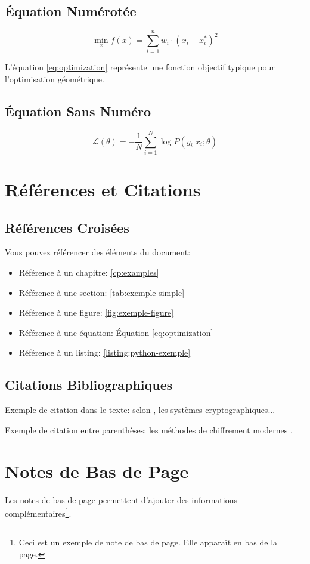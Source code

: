 \subsection{Équation Numérotée}
\begin{equation}
\label{eq:optimization}
\min_{x} f(x) = \sum_{i=1}^{n} w_i \cdot (x_i - x_i^*)^2
\end{equation}

L'équation \ref{eq:optimization} représente une fonction objectif typique pour l'optimisation géométrique.

\subsection{Équation Sans Numéro}
\[
\mathcal{L}(\theta) = -\frac{1}{N} \sum_{i=1}^{N} \log P(y_i | x_i; \theta)
\]

\section{Références et Citations}

\subsection{Références Croisées}
Vous pouvez référencer des éléments du document:
\begin{itemize}
    \item Référence à un chapitre: \autoref{cp:examples}
    \item Référence à une section: \autoref{tab:exemple-simple}
    \item Référence à une figure: \autoref{fig:exemple-figure}
    \item Référence à une équation: Équation \ref{eq:optimization}
    \item Référence à un listing: \autoref{listing:python-exemple}
\end{itemize}

\subsection{Citations Bibliographiques}
Exemple de citation dans le texte: selon \citet{Elgamal1985}, les systèmes cryptographiques... 

Exemple de citation entre parenthèses: les méthodes de chiffrement modernes \citep{Elgamal1985}.

\section{Notes de Bas de Page}
Les notes de bas de page permettent d'ajouter des informations complémentaires\footnote{Ceci est un exemple de note de bas de page. Elle apparaît en bas de la page.}.

